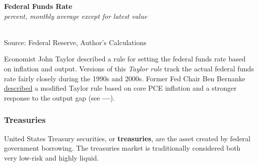 \documentclass{report}
\makeatletter
\newcommand{\tbllink}[1]{\href{https://raw.githubusercontent.com/bdecon/US-chartbook/master/chartbook/data/#1}{\faTable}}
\newcommand*\short[1]{\expandafter\@gobbletwo\number\numexpr#1\relax}
\newcommand{\absnode}[3]{\node[below right, align=left] at (axis cs: #1,#2) {#3};}
\newcommand{\dateaxisticks}{
		date coordinates in=x, axis line style={draw=none},
		xmax={2023-10-01},
		max space between ticks=40,	    
		xtick={{1990-01-01}, {1992-01-01}, {1994-01-01}, 
			{1996-01-01}, {1998-01-01}, {2000-01-01}, 
			{2002-01-01}, {2004-01-01}, {2006-01-01},
			{2008-01-01}, {2010-01-01}, {2012-01-01}, {2014-01-01},
		    {2016-01-01}, {2018-01-01}, {2020-01-01}, {2022-01-01}, 
		    {2024-01-01}, {2026-01-01}},
		minor xtick={{1989-01-01}, {1991-01-01}, {1993-01-01},
			{1995-01-01}, {1997-01-01}, {1999-01-01}, 
			{2001-01-01}, {2003-01-01}, {2005-01-01}, {2007-01-01},
		    {2009-01-01}, {2011-01-01}, {2013-01-01}, {2015-01-01},
		    {2017-01-01}, {2019-01-01}, {2021-01-01}, {2023-01-01}, 
		    {2025-01-01}, {2027-01-01}},
		enlarge y limits={0.06}, enlarge x limits={0.01},
		}
\newcommand{\bbar}[2]{extra #1 ticks = {{#2}}, extra #1 tick labels = ,
		extra #1 tick style = {grid=major, grid style={thick, black!25}},}
\newcommand{\stdline}[4]{\addplot[very thick, no markers, color=#1] 
		table [x=#2, y=#3, col sep=comma] {#4};	}
\newcommand{\thickline}[4]{\addplot[ultra thick, no markers, color=#1] 
		table [x=#2, y=#3, col sep=comma] {#4};	}
\newcommand{\rbars}{
		\fill[color=black!10] (axis cs:{1990-07-01},\pgfkeysvalueof{/pgfplots/ymin}) rectangle 
			(axis cs:{1991-03-01}, \pgfkeysvalueof{/pgfplots/ymax});
		\fill[color=black!10] (axis cs:{2007-12-01},\pgfkeysvalueof{/pgfplots/ymin}) rectangle 
			(axis cs:{2009-07-01}, \pgfkeysvalueof{/pgfplots/ymax});
		\fill[color=black!10] (axis cs:{2001-03-01},\pgfkeysvalueof{/pgfplots/ymin}) rectangle 
			(axis cs:{2001-11-01}, \pgfkeysvalueof{/pgfplots/ymax});
		\fill[color=black!10] (axis cs:{2020-02-01},\pgfkeysvalueof{/pgfplots/ymin}) rectangle 
			(axis cs:{2020-05-01}, \pgfkeysvalueof{/pgfplots/ymax});}
\makeatother
\begin{document}
{\begin{minipage}{0.76\textwidth}
\normalsize \textbf{Federal Funds Rate}\\
\footnotesize{\textit{percent, monthly average except for latest value }}\\
\hspace*{-2mm} \\
\footnotesize{Source: Federal Reserve, Author's Calculations} \hfill \tbllink{rates.csv}
\vspace{2mm}

\small Economist John Taylor described a rule for setting the federal funds rate based on inflation and output. Versions of this \textit{Taylor rule} track the actual federal funds rate fairly closely during the 1990s and 2000s. Former Fed Chair Ben Bernanke \href{https://www.brookings.edu/blog/ben-bernanke/2015/04/28/the-taylor-rule-a-benchmark-for-monetary-policy/}{described} a modified Taylor rule based on core PCE inflation and a stronger response to the output gap (see {\color{cyan!80!white}\textbf{---}}). 
\end{minipage}
\newpage
\begin{minipage}{0.76\textwidth}
\subsubsection*{Treasuries}
\small United States Treasury securities, or \textbf{treasuries}, are the asset created by federal government borrowing. The treasuries market is traditionally considered both very low-risk and highly liquid. 


\end{minipage}}
\end{document}
